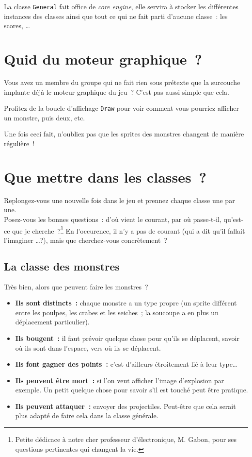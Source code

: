 La classe \texttt{General} fait office de \emph{core engine}, elle servira à stocker les différentes instances des classes ainsi que tout ce qui ne fait parti d'aucune classe~: les scores, \ldots


\section{Quid du moteur graphique~?}

Vous avez un membre du groupe qui ne fait rien sous prétexte que la surcouche implante déjà le moteur graphique du jeu~? C'est pas aussi simple que cela.

Profitez de la boucle d'affichage \texttt{Draw} pour voir comment vous pourriez afficher un monstre, puis deux, etc.

Une fois ceci fait, n'oubliez pas que les sprites des monstres changent de manière régulière~!


\section{Que mettre dans les classes~?}

Replongez-vous une nouvelle fois dans le jeu et prennez chaque classe une par une.\\

Posez-vous les bonnes questions~: d'où vient le courant, par où passe-t-il, qu'est-ce que je cherche~?\footnote{Petite dédicace à notre cher professeur d'électronique, M. {\textsc Gabon}, pour ses questions pertinentes qui changent la vie.} En l'occurence, il n'y a pas de courant (qui a dit qu'il fallait l'imaginer \ldots?), mais que cherchez-vous concrètement~?

\subsection{La classe des monstres}

Très bien, alors que peuvent faire les monstres~?

\begin{itemize}
  \item \textbf{Ils sont distincts~:} chaque monstre a un type propre (un sprite différent entre les poulpes, les crabes et les seiches~; la soucoupe a en plus un déplacement particulier).
  \item \textbf{Ils bougent~:} il faut prévoir quelque chose pour qu'ils se déplacent, savoir où ils sont dans l'espace, vers où ils se déplacent.
  \item \textbf{Ils font gagner des points~:} c'est d'ailleurs étroitement lié à leur type\ldots
  \item \textbf{Ils peuvent être mort~:} si l'on veut afficher l'image d'explosion par exemple. Un petit quelque chose pour savoir s'il est touché peut être pratique.
  \item \textbf{Ils peuvent attaquer~:} envoyer des projectiles. Peut-être que cela serait plus adapté de faire cela dans la classe générale.
\end{itemize}

